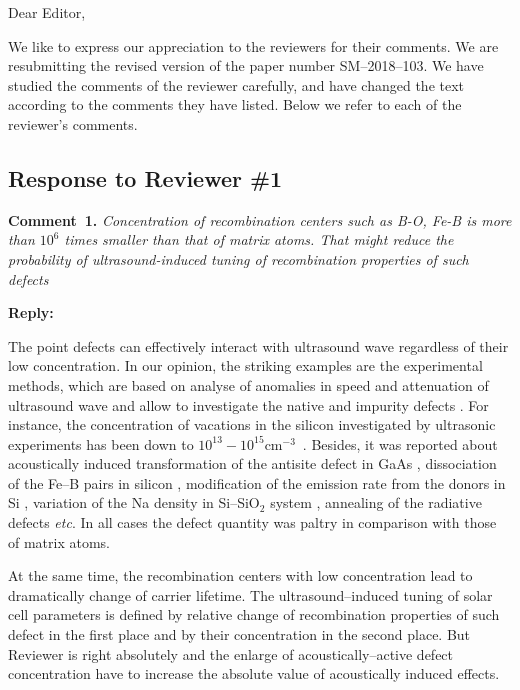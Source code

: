 \documentclass [sort&compress] {elsarticle}
\begin{document}
Dear Editor,

We like to express our appreciation to the reviewers for their comments.
We are resubmitting the revised version of the paper number SM--2018--103.
We have studied the comments of the reviewer carefully, and have changed the text according to the comments they
have listed.
Below we refer to each of the reviewer’s comments.




\subsection*{Response to Reviewer \#1 }

\noindent
\textcolor[rgb]{0.00,0.50,1.00}{\textbf{Comment~1.}}
\emph{Concentration of recombination centers such as B-O, Fe-B is more than $10^6$ times smaller than that of matrix atoms. That might reduce the probability of ultrasound-induced tuning of recombination properties of such defects}

\noindent
\textcolor[rgb]{0.51,0.00,0.00}{\textbf{Reply:}}

The point defects can effectively interact with ultrasound wave regardless of their low concentration.
In our opinion, the striking examples are the experimental methods, which are based on analyse of
 anomalies in speed and attenuation  of ultrasound wave
 and allow to investigate the native and impurity defects \cite{USM:SEYIDOV2016,USM:Zhevstovskikh,USM:Averkin2014,USM:Akatsu2009,USM:Okabe2013}.
For instance, the concentration of vacations in the silicon investigated by ultrasonic experiments has been down to $10^{13}-10^{15}$cm$^{−3}$~\cite{USM:Averkin2014,USM:Okabe2013}.
Besides, it was reported about acoustically induced
transformation of the antisite defect in GaAs \cite{Ostapenko1994},
dissociation of the Fe--B pairs in silicon \cite{Ostapenko1995},
modification of the emission rate from the donors in Si \cite{Korotchenkov1995},
variation of the Na density in Si--SiO$_2$ system \cite{UST:Medvid},
annealing of the radiative defects \cite{Gorb2010,Podolian2012}
\emph{etc}.
In all cases the defect quantity was paltry in comparison with those of matrix atoms.


At the same time, the recombination centers with low concentration lead to dramatically change of carrier lifetime.
The ultrasound--induced tuning of solar cell parameters is defined by relative change of recombination properties of such defect in the first place
and by their concentration in the second place.
But Reviewer is right absolutely and the enlarge of acoustically--active defect concentration have to increase the absolute value of acoustically induced effects.
\end{document}
